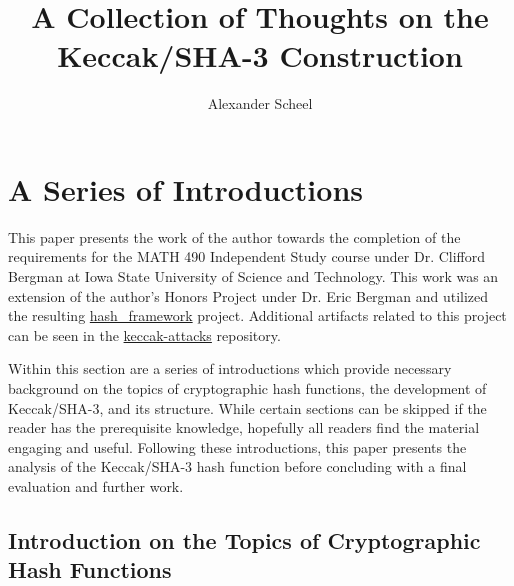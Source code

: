 \documentclass[10pt,twocolumn,twoside]{pnas-new}
\title{A Collection of Thoughts on the Keccak/SHA-3 Construction}
\author{Alexander Scheel}
\affil{Iowa State University}
\begin{document}
\verticaladjustment{-2pt}

\maketitle

% 

\section{A Series of Introductions} \label{sec:intro}
    This paper presents the work of the author towards the completion of the
requirements for the MATH 490 Independent Study course under Dr. Clifford
Bergman at Iowa State University of Science and Technology. This work was an
extension of the author's Honors Project under Dr. Eric Bergman and utilized
the resulting
\href{https://github.com/cipherboy/hash\_framework}{hash\_framework} project.
Additional artifacts related to this project can be seen in the
\href{https://github.com/cipherboy/keccak-attacks}{keccak-attacks} repository.

    Within this section are a series of introductions which provide necessary
background on the topics of cryptographic hash functions, the development of
Keccak/SHA-3, and its structure. While certain sections can be skipped if the
reader has the prerequisite knowledge, hopefully all readers find the material
engaging and useful. Following these introductions, this paper presents the
analysis of the Keccak/SHA-3 hash function before concluding with a final
evaluation and further work.


%

\subsection{Introduction on the Topics of Cryptographic Hash Functions} \label{sec:i:hash}
\end{document}
